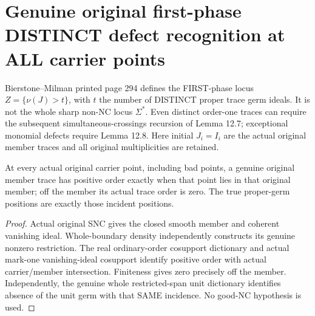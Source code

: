 \section{Genuine original first-phase DISTINCT defect recognition at ALL carrier points}

Bierstone--Milman printed page 294 defines the FIRST-phase locus
$Z=\{\nu(J)>t\}$, with $t$ the number of DISTINCT proper trace germ ideals.
It is not the whole sharp non-NC locus $\Sigma^*$. Even distinct order-one
traces can require the subsequent simultaneous-crossings recursion of Lemma
12.7; exceptional monomial defects require Lemma 12.8. Here initial $J_i=I_i$
are the actual original member traces and all original multiplicities are retained.

\begin{lemma}
\label{hir:sharp-original-member-order-proper-incidence-all-points}
\leanok
At every actual original carrier point, including bad points, a genuine original
member trace has positive order exactly when that point lies in that original
member; off the member its actual trace order is zero. The true proper-germ
positions are exactly those incident positions.
\end{lemma}
\begin{proof}
Actual original SNC gives the closed smooth member and coherent vanishing
ideal. Whole-boundary density independently constructs its genuine nonzero
restriction. The real ordinary-order cosupport dictionary and actual mark-one
vanishing-ideal cosupport identify positive order with actual carrier/member
intersection. Finiteness gives zero precisely off the member. Independently,
the genuine whole restricted-span unit dictionary identifies absence of the
unit germ with that SAME incidence. No good-NC hypothesis is used.
\end{proof}

